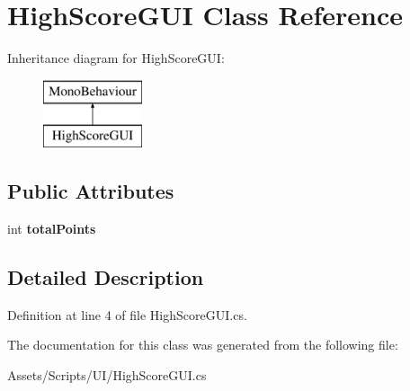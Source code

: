 \hypertarget{class_high_score_g_u_i}{\section{High\+Score\+G\+U\+I Class Reference}
\label{class_high_score_g_u_i}
}
Inheritance diagram for High\+Score\+G\+U\+I\+:\begin{figure}[H]
\begin{center}
\leavevmode
\includegraphics[height=2.000000cm]{class_high_score_g_u_i}
\end{center}
\end{figure}
\subsection*{Public Attributes}
\begin{DoxyCompactItemize}
\item 
\hypertarget{class_high_score_g_u_i_a54ad721c58e2a92affe772079cbfe1e4}{int {\bfseries total\+Points}}\label{class_high_score_g_u_i_a54ad721c58e2a92affe772079cbfe1e4}

\end{DoxyCompactItemize}


\subsection{Detailed Description}


Definition at line 4 of file High\+Score\+G\+U\+I.\+cs.



The documentation for this class was generated from the following file\+:\begin{DoxyCompactItemize}
\item 
Assets/\+Scripts/\+U\+I/High\+Score\+G\+U\+I.\+cs\end{DoxyCompactItemize}
